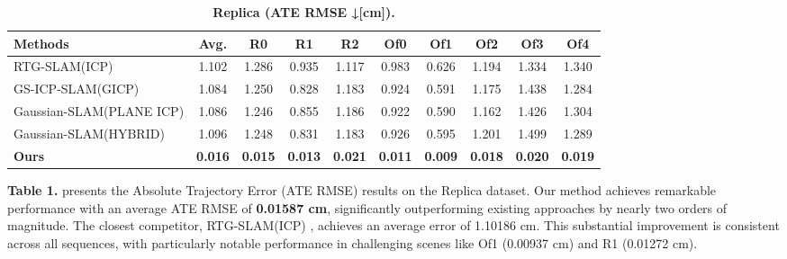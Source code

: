 \documentclass[twocolumn]{article}
\begin{document}
\begin{table}[htbp]
\renewcommand{\thetable}{\textbf{\arabic{table}}}
\renewcommand{\tablename}{\textbf{Table}}
\centering
\caption{\textbf{Replica\cite{straubReplicaDatasetDigital2019} (ATE RMSE ↓[cm]).}}
\label{table:_textbf_replica_cite}
\begin{adjustbox}{max width=\columnwidth,max height=!,center}
\begin{tabular}{lccccccccc}
\toprule
\textbf{Methods} & \textbf{Avg.} & \textbf{R0} & \textbf{R1} & \textbf{R2} & \textbf{Of0} & \textbf{Of1} & \textbf{Of2} & \textbf{Of3} & \textbf{Of4}\\
\midrule
RTG-SLAM(ICP)\cite{pengRTGSLAMRealtime3D2024} & 1.102 & 1.286 & 0.935 & \cellcolor{yellow!30}1.117 & 0.983 & 0.626 & 1.194 & \cellcolor{yellow!30}1.334 & 1.340\\
GS-ICP-SLAM(GICP)\cite{haRGBDGSICPSLAM2024} & \cellcolor{yellow!30}1.084 & 1.250 & \cellcolor{yellow!30}0.828 & 1.183 & \cellcolor{lime!50}0.924 & \cellcolor{lime!50}0.591 & \cellcolor{lime!50}1.175 & 1.438 & \cellcolor{yellow!30}1.284\\
Gaussian-SLAM(PLANE ICP)\cite{yugayGaussianSLAMPhotorealisticDense2024} & \cellcolor{lime!50}1.086 & \cellcolor{yellow!30}1.246 & 0.855 & 1.186 & \cellcolor{yellow!30}0.922 & \cellcolor{yellow!30}0.590 & \cellcolor{yellow!30}1.162 & \cellcolor{lime!50}1.426 & 1.304\\
Gaussian-SLAM(HYBRID)\cite{yugayGaussianSLAMPhotorealisticDense2024} & 1.096 & \cellcolor{lime!50}1.248 & \cellcolor{lime!50}0.831 & \cellcolor{lime!50}1.183 & 0.926 & 0.595 & 1.201 & 1.499 & \cellcolor{lime!50}1.289\\
\midrule
\textbf{Ours} & \cellcolor{green!30}\textbf{0.016} & \cellcolor{green!30}\textbf{0.015} & \cellcolor{green!30}\textbf{0.013} & \cellcolor{green!30}\textbf{0.021} & \cellcolor{green!30}\textbf{0.011} & \cellcolor{green!30}\textbf{0.009} & \cellcolor{green!30}\textbf{0.018} & \cellcolor{green!30}\textbf{0.020} & \cellcolor{green!30}\textbf{0.019}\\
\bottomrule
\end{tabular}
\end{adjustbox}
\end{table}

\textbf{Table 1.} presents the Absolute Trajectory Error (ATE RMSE)
results on the Replica dataset. Our method achieves remarkable
performance with an average ATE RMSE of \textbf{0.01587 cm},
significantly outperforming existing approaches by nearly two orders of
magnitude. The closest competitor, RTG-SLAM(ICP)
\autocite{pengRTGSLAMRealtime3D2024}, achieves an average error of
1.10186 cm. This substantial improvement is consistent across all
sequences, with particularly notable performance in challenging scenes
like Of1 (0.00937 cm) and R1 (0.01272 cm).
\end{document}
